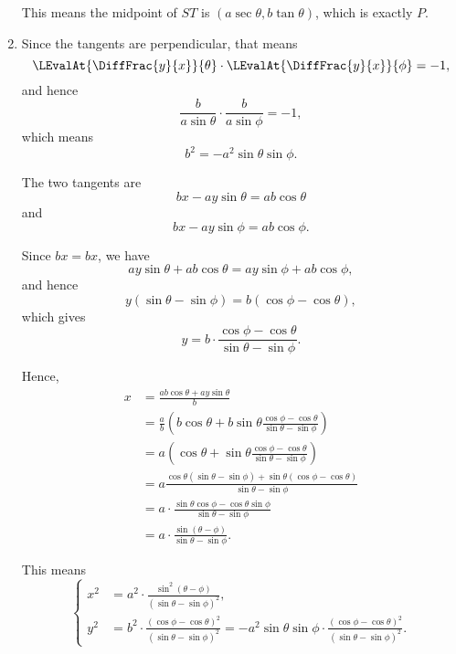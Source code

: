\begin{enumerate}
          This means the midpoint of \(ST\) is \((a \sec \theta, b \tan \theta)\), which is exactly \(P\).

    \item Since the tangents are perpendicular, that means
          \[
              \LEvalAt{\DiffFrac{y}{x}}{\theta} \cdot \LEvalAt{\DiffFrac{y}{x}}{\phi} = -1,
          \]
          and hence
          \[
              \frac{b}{a \sin \theta} \cdot \frac{b}{a \sin \phi} = -1,
          \]
          which means
          \[
              b^2 = - a^2 \sin \theta \sin \phi.
          \]

          The two tangents are
          \[
              bx - ay \sin \theta = ab \cos \theta
          \]
          and
          \[
              bx - ay \sin \phi = ab \cos \phi.
          \]


          Since \(bx = bx\), we have
          \[
              ay \sin \theta + ab \cos \theta = ay \sin \phi + ab \cos \phi,
          \]
          and hence
          \[
              y (\sin \theta - \sin \phi) = b (\cos \phi - \cos \theta),
          \]
          which gives
          \[
              y = b \cdot \frac{\cos \phi - \cos \theta}{\sin \theta - \sin \phi}.
          \]

          Hence,
          \begin{align*}
              x & = \frac{ab \cos \theta + ay \sin \theta}{b}                                                                       \\
                & = \frac{a}{b} \left(b \cos \theta + b \sin \theta \frac{\cos \phi - \cos \theta}{\sin \theta - \sin \phi}\right)  \\
                & = a \left(\cos \theta + \sin \theta \frac{\cos \phi - \cos \theta}{\sin \theta - \sin \phi}\right)                \\
                & = a \frac{\cos \theta (\sin \theta - \sin \phi) + \sin \theta (\cos \phi - \cos \theta)}{\sin \theta - \sin \phi} \\
                & = a \cdot \frac{\sin \theta \cos \phi - \cos \theta \sin \phi}{\sin \theta - \sin \phi}                           \\
                & = a \cdot \frac{\sin(\theta - \phi)}{\sin \theta - \sin \phi}.
          \end{align*}

          This means
          \[
              \left\{
              \begin{aligned}
                  x^2 & = a^2 \cdot \frac{\sin^2 (\theta - \phi)}{\left(\sin \theta - \sin \phi\right)^2},                                                                                                                                           \\
                  y^2 & = b^2 \cdot \frac{\left(\cos \phi - \cos \theta\right)^2}{\left(\sin \theta - \sin \phi\right)^2} = - a^2 \sin \theta \sin \phi \cdot \frac{\left(\cos \phi - \cos \theta\right)^2}{\left(\sin \theta - \sin \phi\right)^2}.
              \end{aligned}
              \right.
          \]


\end{enumerate}
